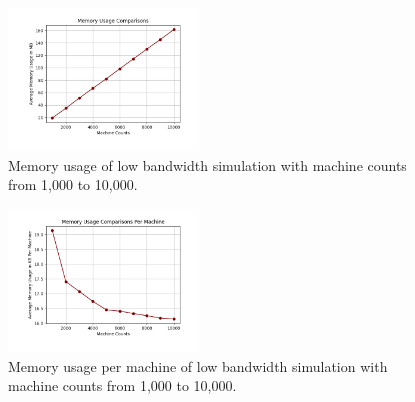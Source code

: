 \documentclass[journal]{IEEEtran} %
\newcommand{\imagewidth}{0.45\textwidth}
\begin{document}
\begin{figure}[H]
    \centerline{\includegraphics[width=\imagewidth]{Images/low_band_memory_one_to_ten.png}}
    \caption{Memory usage of low bandwidth simulation with machine counts from 1,000 to 10,000.}
    \label{fig:low_band_memory_one_to_ten}
\end{figure}

\begin{figure}[H]
    \centerline{\includegraphics[width=\imagewidth]{Images/mem_usage_per_machine_thousand_to_ten_thousand.png}}
    \caption{Memory usage per machine of low bandwidth simulation with machine counts from 1,000 to 10,000.}
    \label{fig:low_band_memory_per_machine_one_to_ten}
\end{figure}
\end{document}
